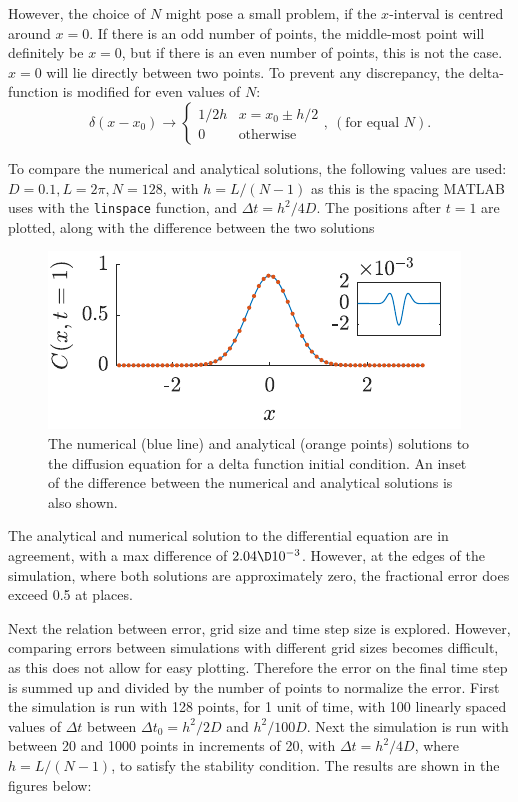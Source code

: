 \documentclass[a4paper,10pt]{article} 	%
\numberwithin{equation}{section}
\begin{document}
	However, the choice of $ N $ might pose a small problem, if the $ x $-interval is centred around $ x=0 $. If there is an odd number of points, the middle-most point will definitely be $ x=0 $, but if there is an even number of points, this is not the case. $ x = 0 $ will lie directly between two points. To prevent any discrepancy, the delta-function is modified for even values of $ N $:
	\begin{equation}\label{key}
	\delta(x-x_0) \to \begin{cases}
	1/2h & x=x_0\pm h/2 \\
	0 & \text{otherwise}
	\end{cases}, \ (\text{for equal } N).
	\end{equation}
	
	To compare the numerical and analytical solutions, the following values are used: $D = 0.1, L = 2\pi,N=128 $, with $ h=L/(N-1) $ as this is the spacing MATLAB uses with the \texttt{linspace} function, and $ \Delta t = h^2/4D $. The positions after $ t = 1 $ are plotted, along with the difference between the two solutions
	\begin{figure}[H]
		\centering
		\includegraphics[width = 0.5\linewidth]{diffSimple.pdf}
		\caption{The numerical (blue line) and analytical (orange points) solutions to the diffusion equation for a delta function initial condition. An inset of the difference between the numerical and analytical solutions is also shown.}
		\label{fig:diffSimple}
	\end{figure}
	The analytical and numerical solution to the differential equation are in agreement, with a max difference of $ 2.04\D10^{-3} $. However, at the edges of the simulation, where both solutions are approximately zero, the fractional error does exceed 0.5 at places.
	
	Next the relation between error, grid size and time step size is explored. However, comparing errors between simulations with different grid sizes becomes difficult, as this does not allow for easy plotting. Therefore the error on the final time step is summed up and divided by the number of points to normalize the error. First the simulation is run with 128 points, for 1 unit of time, with 100 linearly spaced values of $ \Delta t $ between $ \Delta t_0 = h^2/2D $ and $ h^2/100D $. Next the simulation is run with between 20 and 1000 points in increments of 20, with $ \Delta t = h^2/4D $, where $ h = L/(N-1) $, to satisfy the stability condition. The results are shown in the figures below:
	 
\end{document}
